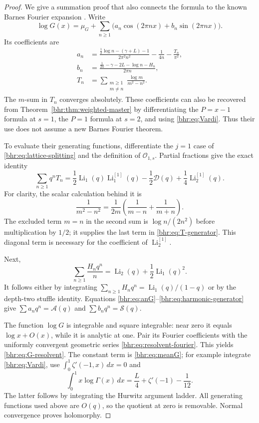 \documentclass[11pt]{article}
\numberwithin{equation}{section}
\theoremstyle{plain}
\theoremstyle{definition}
\theoremstyle{remark}
\DeclareMathOperator{\Li}{Li}
\begin{document}
\begin{proof}
We give a summation proof that also connects the formula to the
known Barnes Fourier expansion \cite[Theorems 2--3]{bhr:Mezo}.
Write
\[
 \log G(x)=\mu_G+\sum_{n\ge1}
                  \bigl(a_n\cos(2\pi nx)+b_n\sin(2\pi nx)\bigr).
\]
Its coefficients are
\begin{align}
 a_n&=\frac{\frac12\log n-(\gamma+L)-1}{2\pi^2n^2}
                -\frac1{4n}-\frac{T_n}{\pi^2},\label{bhr:eq:anG}\\
 b_n&=\frac{\frac1{2n}-\gamma-2L-\log n-H_n}{2\pi n},
          \label{bhr:eq:bnG}\\
 T_n&=\sum_{\substack{m\ge1\\m\ne n}}
                          \frac{\log m}{m^2-n^2}.
          \label{bhr:eq:Tn}
\end{align}
The $m$-sum in $T_n$ converges absolutely. These coefficients
can also be recovered from Theorem~\ref{bhr:thm:weighted-master}
by differentiating the $P=x-1$ formula at $s=1$, the $P=1$
formula at $s=2$, and using \eqref{bhr:eq:Vardi}. Thus their use
does not assume a new Barnes Fourier theorem.

To evaluate their generating functions, differentiate the
$j=1$ case of \eqref{bhr:eq:lattice-splitting} and the definition
of $\mathcal O_{1,s}$. Partial fractions give the exact identity
\begin{equation}\label{bhr:eq:T-generator}
 \sum_{n\ge1}q^nT_n
   =\frac12\Li_1(q)\Li_1^{[1]}(q)
       -\frac12\mathcal D(q)+\frac14\Li_2^{[1]}(q).
\end{equation}
For clarity, the scalar calculation behind it is
\[
 \frac1{m^2-n^2}=
     \frac1{2m}\left(\frac1{m-n}+\frac1{m+n}\right).
\]
The excluded term $m=n$ in the second sum is
$\log n/(2n^2)$ before multiplication by $1/2$; it supplies
the last term in \eqref{bhr:eq:T-generator}. This diagonal term
is necessary for the coefficient of $\Li_2^{[1]}$.

Next,
\begin{equation}\label{bhr:eq:harmonic-generator}
 \sum_{n\ge1}\frac{H_nq^n}{n}
      =\Li_2(q)+\frac12\Li_1(q)^2.
\end{equation}
It follows either by integrating
$\sum_{n\ge1}H_nq^n=\Li_1(q)/(1-q)$ or by the depth-two
stuffle identity. Equations \eqref{bhr:eq:anG}--\eqref{bhr:eq:harmonic-generator}
give $\sum a_nq^n=\mathcal A(q)$ and
$\sum b_nq^n=\mathcal S(q)$.

The function $\log G$ is integrable and square integrable:
near zero it equals $\log x+O(x)$, while it is analytic at one.
Pair its Fourier coefficients with the uniformly convergent
geometric series \eqref{bhr:eq:resolvent-fourier}. This yields
\eqref{bhr:eq:G-resolvent}. The constant term is
\eqref{bhr:eq:meanG}; for example integrate \eqref{bhr:eq:Vardi}, use
$\int_0^1\zeta'(-1,x)\,dx=0$ and
\[
 \int_0^1x\log\Gamma(x)\,dx
       =\frac L4+\zeta'(-1)-\frac1{12}.
\]
The latter follows by integrating the Hurwitz argument ladder.
All generating functions used above are $O(q)$, so the quotient
at zero is removable. Normal convergence proves holomorphy.
\end{proof}
\end{document}

